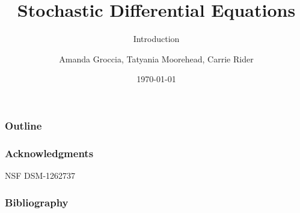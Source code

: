 \documentclass{beamer} %
\begin{document}
\author{Amanda Groccia, Tatyania Moorehead, Carrie Rider}



\title{Stochastic Differential Equations}
\subtitle{Introduction}
\date{\today}

\begin{frame}
  \titlepage
\end{frame}


\begin{frame}
  \frametitle{Outline}
  \tableofcontents[hideallsubsections]
\end{frame}
















\begin{frame}
  \frametitle{Acknowledgments}

  NSF DSM-1262737

  

\end{frame}

\begin{frame}
  \frametitle{Bibliography}

  
  
  
\end{frame}
\end{document}
